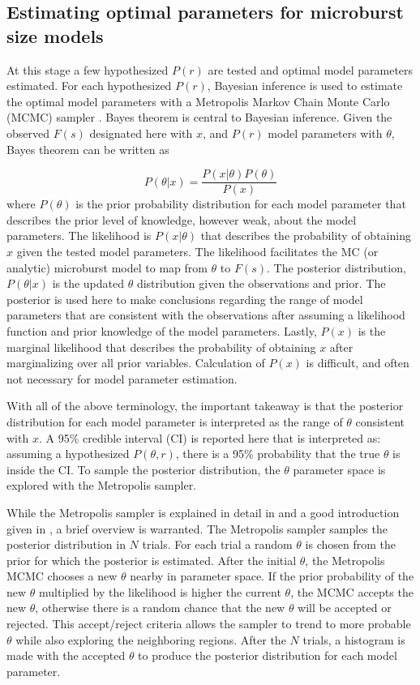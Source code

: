 \documentclass[draft]{agujournal2019}
\begin{document}
\subsection{Estimating optimal parameters for microburst size models}
At this stage a few hypothesized $P(r)$ are tested and optimal model parameters estimated. For each hypothesized $P(r)$, Bayesian inference is used to estimate the optimal model parameters with a Metropolis Markov Chain Monte Carlo (MCMC) sampler \cite{Metropolis1953}. Bayes theorem is central to Bayesian inference. Given the observed $F(s)$ designated here with $x$, and $P(r)$ model parameters with $\theta$, Bayes theorem can be written as

\begin{equation}
P(\theta | x) = \frac{P(x | \theta) P(\theta)}{P(x)}
\end{equation} where $P(\theta)$ is the prior probability distribution for each model parameter that describes the prior level of knowledge, however weak, about the model parameters. The likelihood is $P(x | \theta)$ that describes the probability of obtaining $x$ given the tested model parameters. The likelihood facilitates the MC (or analytic) microburst model to map from $\theta$ to $F(s)$. The posterior distribution, $P(\theta | x)$ is the updated $\theta$ distribution given the observations and prior. The posterior is used here to make conclusions regarding the range of model parameters that are consistent with the observations after assuming a likelihood function and prior knowledge of the model parameters. Lastly, $P(x)$ is the marginal likelihood that describes the probability of obtaining $x$ after marginalizing over all prior variables. Calculation of $P(x)$ is difficult, and often not necessary for model parameter estimation. 

With all of the above terminology, the important takeaway is that the posterior distribution for each model parameter is interpreted as the range of $\theta$ consistent with $x$. A 95\% credible interval (CI) is reported here that is interpreted as: assuming a hypothesized $P(\theta, r)$, there is a 95\% probability that the true $\theta$ is inside the CI. To sample the posterior distribution, the $\theta$ parameter space is explored with the Metropolis sampler.

While the Metropolis sampler is explained in detail in  and a good introduction given in , a brief overview is warranted. The Metropolis sampler samples the posterior distribution in $N$ trials. For each trial a random $\theta$ is chosen from the prior for which the posterior is estimated. After the initial $\theta$, the Metropolis MCMC chooses a new $\theta$ nearby in parameter space. If the prior probability of the new $\theta$ multiplied by the likelihood is higher the current $\theta$, the MCMC accepts the new $\theta$, otherwise there is a random chance that the new $\theta$ will be accepted or rejected. This accept/reject criteria allows the sampler to trend to more probable $\theta$ while also exploring the neighboring regions. After the $N$ trials, a histogram is made with the accepted $\theta$ to produce the posterior distribution for each model parameter.
\end{document}
